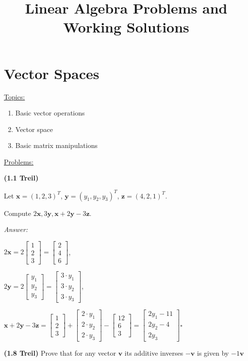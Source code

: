 \documentclass{book}
\title{Linear Algebra Problems and Working Solutions}
\date{}
\renewcommand{\vec}[1]{\mathbf{#1}}
\begin{document}
	\maketitle
	\chapter{Vector Spaces}
	\underline{Topics:}
	\begin{enumerate}
		\item Basic vector operations
		\item Vector space
		\item Basic matrix manipulations
	\end{enumerate}	
	\underline{Problems:}
	
	\noindent\textbf{(1.1 Treil)}
	
	Let $\vec{x} = (1,2,3)^T$,
	$\vec{y} = (y_1,y_2,y_3)^T$, 
	$\vec{z} = (4,2,1)^T.$ 
	
	Compute $2\vec{x}, 3\vec{y}, \vec{x}+2\vec{y}-3\vec{z}.$  	
	
	\textit{Answer:}
	
	$
	2\vec{x}=2 
	\begin{bmatrix}
	1\\2\\3
	\end{bmatrix}
	= \begin{bmatrix}
	2\\4\\6
	\end{bmatrix}
	$,
	
	$
	2\vec{y}=2 
	\begin{bmatrix}
	y_1\\y_2\\y_3
	\end{bmatrix}
	= \begin{bmatrix}
	3\cdot y_1\\3\cdot y_2\\3\cdot y_3
	\end{bmatrix}
	$,

	$
	\vec{x}+2\vec{y}-3\vec{z}= 
	\begin{bmatrix}
	1\\2\\3
	\end{bmatrix}+
	\begin{bmatrix}
	2\cdot y_1\\2\cdot y_2\\2\cdot y_3
	\end{bmatrix}-
	\begin{bmatrix}
	12\\6\\3
	\end{bmatrix}=
	\begin{bmatrix}
	2y_1-11\\2y_2-4\\2y_3
	\end{bmatrix}
	\square $
	
	
	\noindent\textbf{(1.8 Treil)}
	Prove that for any vector $\vec{v}$ its additive inverses $-\vec{v}$ is given by $-1\vec{v}$
	
	
	
		
	
	
\end{document}
